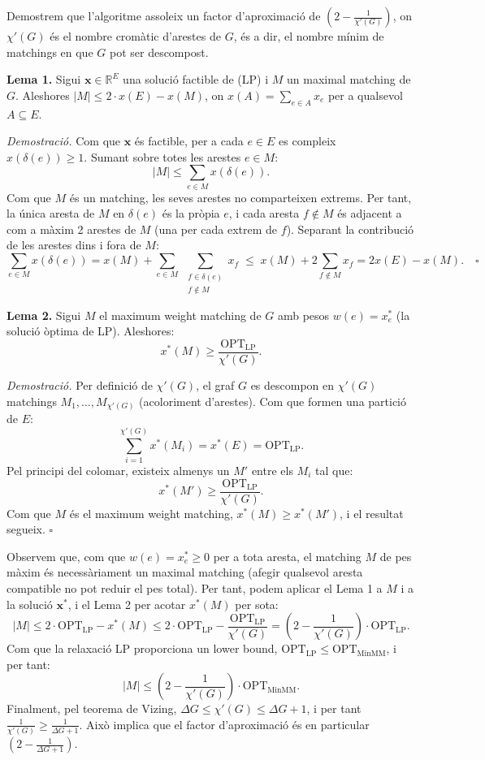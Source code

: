 Demostrem que l'algoritme assoleix un factor d'aproximació de $\left(2 - \frac{1}{\chi'(G)}\right)$, on $\chi'(G)$ és el nombre cromàtic d'arestes de $G$, és a dir, el nombre mínim de matchings en que $G$ pot ser descompost.

\textbf{Lema 1.} Sigui $\mathbf{x} \in \mathbb{R}^E$ una solució factible de (LP) i $M$ un maximal matching de $G$. Aleshores $|M| \le 2 \cdot x(E) - x(M)$, on $x(A) = \sum_{e \in A} x_e$ per a qualsevol $A \subseteq E$.

\textit{Demostració.} Com que $\mathbf{x}$ és factible, per a cada $e \in E$ es compleix $x(\delta(e)) \ge 1$. Sumant sobre totes les arestes $e \in M$:
\[
|M| \le \sum_{e \in M} x(\delta(e)).
\]
Com que $M$ és un matching, les seves arestes no comparteixen extrems. Per tant, la única aresta de $M$ en $\delta(e)$ és la pròpia $e$, i cada aresta $f \notin M$ és adjacent a com a màxim 2 arestes de $M$ (una per cada extrem de $f$). Separant la contribució de les arestes dins i fora de $M$:
\[
\sum_{e \in M} x(\delta(e)) = x(M) + \sum_{e \in M}\;\sum_{\substack{f \in \delta(e) \\ f \notin M}} x_f \;\le\; x(M) + 2\sum_{f \notin M} x_f = 2x(E) - x(M). \quad \square
\]

\textbf{Lema 2.} Sigui $M$ el maximum weight matching de $G$ amb pesos $w(e) = x^*_e$ (la solució òptima de LP). Aleshores:
\[
x^*(M) \ge \frac{\mathrm{OPT_{LP}}}{\chi'(G)}.
\]

\textit{Demostració.} Per definició de $\chi'(G)$, el graf $G$ es descompon en $\chi'(G)$ matchings $M_1, \ldots, M_{\chi'(G)}$ (acoloriment d'arestes). Com que formen una partició de $E$:
\[
\sum_{i=1}^{\chi'(G)} x^*(M_i) = x^*(E) = \mathrm{OPT_{LP}}.
\]
Pel principi del colomar, existeix almenys un $M'$ entre els $M_i$ tal que:
\[
x^*(M') \ge \frac{\mathrm{OPT_{LP}}}{\chi'(G)}.
\]
Com que $M$ és el maximum weight matching, $x^*(M) \ge x^*(M')$, i el resultat segueix. $\square$

\medskip
Observem que, com que $w(e) = x^*_e \ge 0$ per a tota aresta, el matching $M$ de pes màxim és necessàriament un maximal matching (afegir qualsevol aresta compatible no pot reduir el pes total). Per tant, podem aplicar el Lema 1 a $M$ i a la solució $\mathbf{x}^*$, i el Lema 2 per acotar $x^*(M)$ per sota:
\[
|M| \le 2 \cdot \mathrm{OPT_{LP}} - x^*(M) \le 2 \cdot \mathrm{OPT_{LP}} - \frac{\mathrm{OPT_{LP}}}{\chi'(G)} = \left(2 - \frac{1}{\chi'(G)}\right) \cdot \mathrm{OPT_{LP}}.
\]
Com que la relaxació LP proporciona un lower bound, $\mathrm{OPT_{LP}} \le \mathrm{OPT_{MinMM}}$, i per tant:
\[
|M| \le \left(2 - \frac{1}{\chi'(G)}\right) \cdot \mathrm{OPT_{MinMM}}.
\]
Finalment, pel teorema de Vizing, $\Delta G \le \chi'(G) \le \Delta G + 1$, i per tant $\frac{1}{\chi'(G)} \ge \frac{1}{\Delta G + 1}$. Això implica que el factor d'aproximació és en particular $\left(2 - \frac{1}{\Delta G + 1}\right)$.

